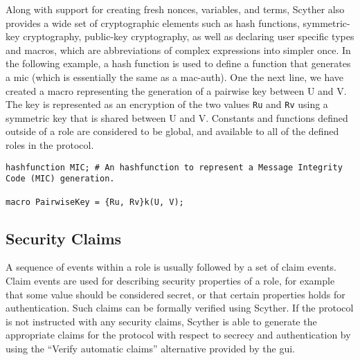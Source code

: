 Along with support for creating fresh nonces, variables, and terms, Scyther also provides a wide set of cryptographic elements such as hash functions, symmetric-key cryptography, public-key cryptography, as well as declaring user specific types and macros, which are abbreviations of complex expressions into simpler once. In the following example, a hash function is used to define a function that generates a \gls{mic} (which is essentially the same as a \gls{mac-auth}). One the next line, we have created a macro representing the generation of a pairwise key between U and V. The key is represented as an encryption of the two values \texttt{Ru} and \texttt{Rv} using a symmetric key that is shared between U and V. Constants and functions defined outside of a role are considered to be global, and available to all of the defined roles in the protocol.\newline

\begin{lstlisting}
hashfunction MIC; # An hashfunction to represent a Message Integrity Code (MIC) generation.

macro PairwiseKey = {Ru, Rv}k(U, V);
\end{lstlisting}



%	

\subsection{Security Claims}

A sequence of events within a role is usually followed by a set of claim events. Claim events are used for describing security properties of a role, for example that some value should be considered secret, or that certain properties holds for authentication. Such claims can be formally verified using Scyther. If the protocol is not instructed with any security claims, Scyther is able to generate the appropriate claims  for the protocol with respect to secrecy and authentication by using the ``Verify automatic claims'' alternative provided by the \gls{gui}.

